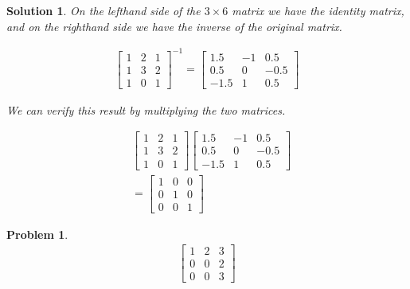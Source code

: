 \documentclass{article}
\newtheorem{problem}{Problem}
\newtheorem*{solution}{Solution}
\begin{document}
\begin{solution}
On the lefthand side of the $3 \times 6$ matrix we have the identity matrix, and on the righthand side we have the inverse of the original matrix.

\begin{align*}
\begin{bmatrix}1 & 2 & 1 \\ 1 & 3 & 2 \\ 1 & 0 & 1 \end{bmatrix}^{-1} = \begin{bmatrix}1.5 & -1 & 0.5 \\ 0.5 & 0 & -0.5 \\ -1.5 & 1 & 0.5 \end{bmatrix}
\end{align*}

We can verify this result by multiplying the two matrices.

\begin{align*}
& \begin{bmatrix} 1 & 2 & 1 \\ 1 & 3 & 2 \\ 1 & 0 & 1 \end{bmatrix} \begin{bmatrix}1.5 & -1 & 0.5 \\ 0.5 & 0 & -0.5 \\ -1.5 & 1 & 0.5 \end{bmatrix} \\
&= \begin{bmatrix} 1 & 0 & 0 \\ 0 & 1 & 0 \\ 0 & 0 & 1 \end{bmatrix} 
\end{align*}

\end{solution}

\begin{problem}
\begin{align*}
\begin{bmatrix}
1 & 2 & 3 \\
0 & 0 & 2 \\
0 & 0 & 3
\end{bmatrix}
\end{align*}
\end{problem}
\end{document}
